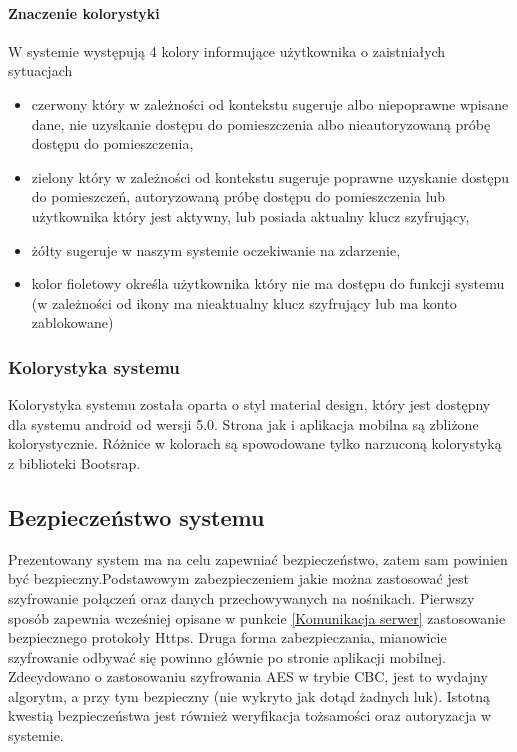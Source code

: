 		\paragraph*{Znaczenie kolorystyki}
		W systemie występują 4 kolory informujące użytkownika o zaistniałych sytuacjach
		\begin{itemize}
			\item czerwony który w zależności od kontekstu sugeruje albo niepoprawne wpisane dane, nie uzyskanie dostępu do pomieszczenia albo nieautoryzowaną próbę dostępu do pomieszczenia,
			\item zielony który w zależności od kontekstu sugeruje poprawne uzyskanie dostępu do pomieszczeń, autoryzowaną próbę dostępu do pomieszczenia lub użytkownika który jest aktywny, lub posiada aktualny klucz szyfrujący,
			\item żółty sugeruje w naszym systemie oczekiwanie na zdarzenie,
			\item kolor fioletowy określa użytkownika który nie ma dostępu do funkcji systemu (w zależności od ikony ma nieaktualny klucz szyfrujący lub ma konto zablokowane)
		\end{itemize}
		
	\subsubsection{Kolorystyka systemu}
	Kolorystyka systemu została oparta o styl material design, który jest dostępny dla systemu android od wersji 5.0. Strona jak i aplikacja mobilna są zbliżone kolorystycznie. Różnice w kolorach są spowodowane tylko narzuconą kolorystyką z biblioteki Bootsrap.\cite{desingMobile}\cite{And}
	
\newpage
	\subsection{Bezpieczeństwo systemu}\label{sec:Projekt bezpieczeństwo}
	Prezentowany system ma na celu zapewniać bezpieczeństwo, zatem sam powinien być bezpieczny.Podstawowym zabezpieczeniem jakie można zastosować jest szyfrowanie połączeń oraz danych przechowywanych na nośnikach. Pierwszy sposób zapewnia wcześniej opisane w punkcie \ref{Komunikacja serwer} zastosowanie bezpiecznego protokoły Https. Druga forma zabezpieczania, mianowicie szyfrowanie odbywać się powinno głównie po stronie aplikacji mobilnej. Zdecydowano o zastosowaniu szyfrowania AES w trybie CBC, jest to wydajny algorytm, a przy tym bezpieczny (nie wykryto jak dotąd żadnych luk). Istotną kwestią bezpieczeństwa jest również weryfikacja tożsamości oraz autoryzacja w systemie.
